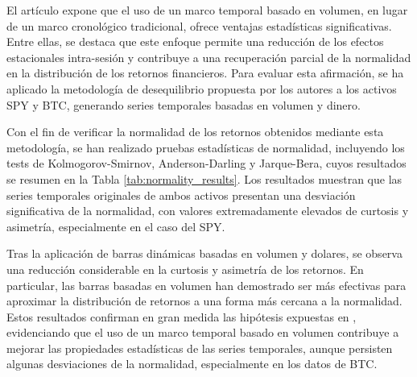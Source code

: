 \documentclass[a4paper,12pt, twoside]{report}
\begin{document}
El artículo \cite{easley2012volume} expone que el uso de un marco temporal basado en volumen, en lugar de un 
marco cronológico tradicional, ofrece ventajas estadísticas significativas. Entre ellas, se destaca que 
este enfoque permite una reducción de los efectos estacionales intra-sesión y contribuye a una recuperación 
parcial de la normalidad en la distribución de los retornos financieros. Para evaluar esta afirmación, se 
ha aplicado la metodología de desequilibrio propuesta por los autores a los activos SPY y BTC, generando 
series temporales basadas en volumen y dinero.

Con el fin de verificar la normalidad de los retornos obtenidos mediante esta metodología, se han realizado 
pruebas estadísticas de normalidad, incluyendo los tests de Kolmogorov-Smirnov, Anderson-Darling y Jarque-Bera, 
cuyos resultados se resumen en la Tabla \ref{tab:normality_results}. Los resultados muestran que las series 
temporales originales de ambos activos presentan una desviación significativa de la normalidad, con valores 
extremadamente elevados de curtosis y asimetría, especialmente en el caso del SPY. 

Tras la aplicación de barras dinámicas basadas en volumen y dolares, se observa una reducción considerable 
en la curtosis y asimetría de los retornos. En particular, las barras basadas en volumen han demostrado 
ser más efectivas para aproximar la distribución de retornos a una forma más cercana a la normalidad. 
Estos resultados confirman en gran medida las hipótesis expuestas en \cite{easley2012volume}, 
evidenciando que el uso de un marco temporal basado en volumen contribuye a mejorar las propiedades 
estadísticas de las series temporales, aunque persisten algunas desviaciones de la normalidad, 
especialmente en los datos de BTC.
\end{document}
